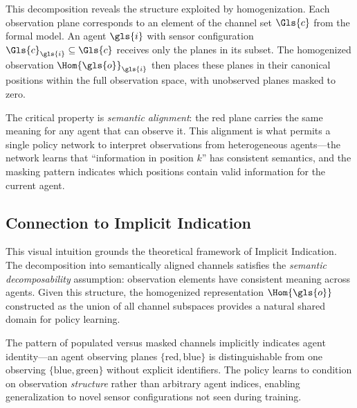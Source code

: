This decomposition reveals the structure exploited by homogenization. 
Each observation plane corresponds to an element of the channel set 
\(\Gls{c}\) from the formal model. An agent \(\gls{i}\) with sensor 
configuration \(\Gls{c}_{\gls{i}} \subseteq \Gls{c}\) receives only 
the planes in its subset. The homogenized observation 
\(\Hom{\gls{o}}_{\gls{i}}\) then places these planes in their 
canonical positions within the full observation space, with 
unobserved planes masked to zero.

The critical property is \emph{semantic alignment}: the red plane 
carries the same meaning for any agent that can observe it. This 
alignment is what permits a single policy network to interpret 
observations from heterogeneous agents—the network learns that 
``information in position \(k\)'' has consistent semantics, and 
the masking pattern indicates which positions contain valid 
information for the current agent.

\subsection{Connection to Implicit Indication}

This visual intuition grounds the theoretical framework of 
Implicit Indication. The decomposition into semantically 
aligned channels satisfies the \emph{semantic decomposability} 
assumption: observation elements have consistent meaning across 
agents. Given this structure, the homogenized representation 
\(\Hom{\gls{o}}\) constructed as the union of all channel 
subspaces provides a natural shared domain for policy learning.

The pattern of populated versus masked channels implicitly 
indicates agent identity—an agent observing planes 
\(\{\text{red}, \text{blue}\}\) is distinguishable from one 
observing \(\{\text{blue}, \text{green}\}\) without explicit 
identifiers. The policy learns to condition on observation 
\emph{structure} rather than arbitrary agent indices, enabling 
generalization to novel sensor configurations not seen during training.
